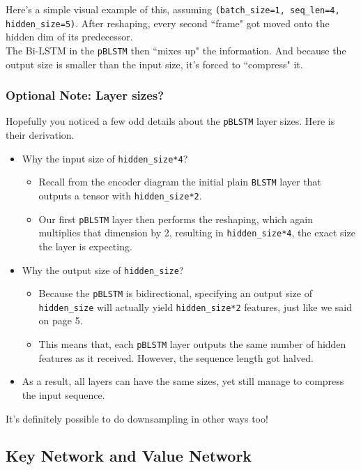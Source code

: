 \documentclass{article}
\newcommand{\ttt}[1]{\texttt{#1}}
\begin{document}
Here's a simple visual example of this, assuming \ttt{(batch\_size=1, seq\_len=4, hidden\_size=5)}. After reshaping, every second ``frame" got moved onto the hidden dim of its predecessor. \\

The Bi-LSTM in the \ttt{pBLSTM} then ``mixes up" the information. And because the output size is smaller than the input size, it's forced to ``compress" it.

\subsubsection{Optional Note: Layer sizes?}

Hopefully you noticed a few odd details about the \ttt{pBLSTM} layer sizes. Here is their derivation.

\begin{itemize}
    \item Why the input size of \ttt{hidden\_size*4}?
    \begin{itemize}
        \item Recall from the encoder diagram the initial plain \ttt{BLSTM} layer that outputs a tensor with \ttt{hidden\_size*2}.
        \item Our first \ttt{pBLSTM} layer then performs the reshaping, which again multiplies that dimension by 2, resulting in \ttt{hidden\_size*4}, the exact size the layer is expecting.
    \end{itemize}
    \item Why the output size of \ttt{hidden\_size}?
    \begin{itemize}
        \item Because the \ttt{pBLSTM} is bidirectional, specifying an output size of \ttt{hidden\_size} will actually yield \ttt{hidden\_size*2} features, just like we said on page 5.
        \item This means that, each \ttt{pBLSTM} layer outputs the same number of hidden features as it received. However, the sequence length got halved.
    \end{itemize}
    \item As a result, all layers can have the same sizes, yet still manage to compress the input sequence.
\end{itemize}

It's definitely possible to do downsampling in other ways too!


\newpage

\subsection{Key Network and Value Network}
\end{document}
